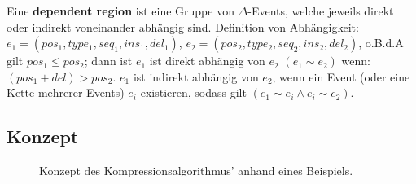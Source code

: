 \documentclass[12pt]{article}
\begin{document}
Eine \textbf{dependent region} ist eine Gruppe von $\Delta$-Events, welche jeweils direkt oder indirekt voneinander abhängig sind. Definition von Abhängigkeit: $e_{1} = (pos_{1},type_{1},seq_{1},ins_{1},del_{1})$, $e_{2} = (pos_{2},type_{2},seq_{2},ins_{2},del_{2})$, o.B.d.A gilt $pos_{1} \le pos_{2} $; dann ist $e_{1}$ ist direkt abhängig von $e_{2}$  $(e_{1}\sim e_{2})$ wenn: $(pos_{1}+del) > pos_{2} $. $e_{1}$ ist indirekt abhängig von $e_{2}$,  wenn ein Event (oder eine Kette mehrerer Events) $e_{i}$ existieren, sodass gilt $(e_{1}\sim e_{i} \wedge e_{i}\sim e_{2})$.

%


\subsection{Konzept}

\begin{figure}
\label{fig:konzept}
\caption{Konzept des Kompressionsalgorithmus' anhand eines Beispiels.}
\end{figure}
\end{document}
